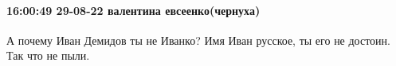  
 
 
 
 

\paragraph{16:00:49 29-08-22 валентина евсеенко(чернуха)}

А почему Иван Демидов ты не Иванко? Имя Иван русское, ты его не достоин. Так
что не пыли.
